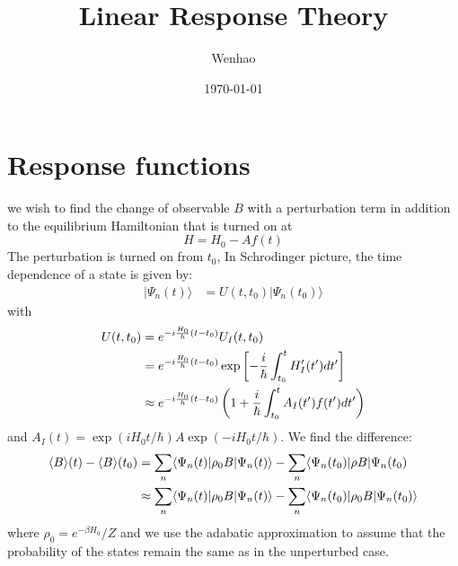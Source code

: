 \documentclass{article}
\begin{document}
\title{Linear Response Theory}
\author{Wenhao}
\date{\today}
\maketitle

\section{Response functions}
we wish to find the change of observable $B$ with a perturbation term in addition to the equilibrium Hamiltonian 
that is turned on at 
\begin{equation}
     H = H_0 - Af(t)
\end{equation}
The perturbation is turned on from $t_0$, 
In Schrodinger picture, the time dependence of a state is given by:
\begin{align}
    | \Psi_n(t) \rangle &= U(t,t_0) | \Psi_n(t_0) \rangle 
\end{align}
with
\begin{align}
    U(t,t_0) &= e^{-i\frac{H_0}{h}(t-t_0)} U_I(t,t_0) \notag \\
                 &= e^{-i\frac{H_0}{h}(t-t_0)} \exp\left[ -\frac{i}{\hbar} \int_{t_0}^{t} H_I'(t') dt'  \right] \notag \\
                 &\approx e^{-i\frac{H_0}{h}(t-t_0)} \left( 1 + \frac{i}{\hbar} \int_{t_0}^{t} A_I(t')f(t') dt' \right)
\end{align}
and $A_I(t) = \exp(iH_0t/\hbar) A \exp(-iH_0t/\hbar)$. We find the difference:
\begin{align}
    \langle B \rangle(t) - \langle B \rangle(t_0) 
    &= \sum_n \langle \Psi_n(t) | \rho_{0} B | \Psi_n(t) \rangle - \sum_n \langle \Psi_n(t_0) | \rho B | \Psi_n(t_0) \notag \\
    &\approx \sum_n \langle \Psi_n(t) | \rho_{0} B | \Psi_n(t) \rangle - \sum_n \langle \Psi_n(t_0) | \rho_{0} B | \Psi_n(t_0) \rangle
\end{align}
where $\rho_0 = e^{-\beta H_0} / Z$ and we use the adabatic approximation to assume that the probability of 
the states remain the same as in the unperturbed case. 
\end{document}
